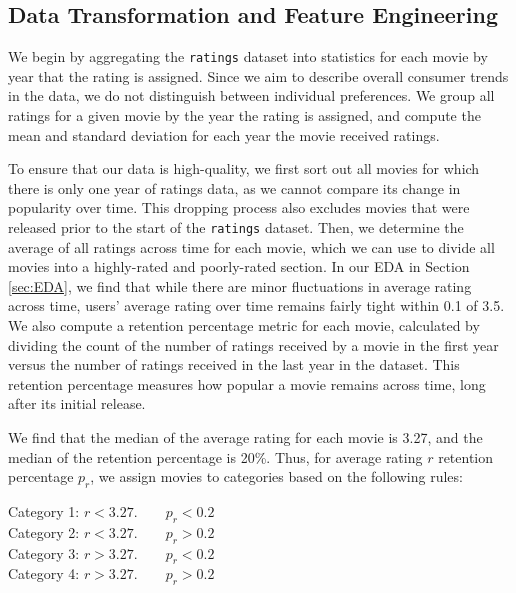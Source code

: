 \documentclass[12pt]{article}
\begin{document}


\subsection{Data Transformation and Feature Engineering}
\label{sec:data}
We begin by aggregating the \texttt{ratings} dataset into statistics for each movie by year that the rating is assigned. Since we aim to describe overall consumer trends in the data, we do not distinguish between individual preferences. We group all ratings for a given movie by the year the rating is assigned, and compute the mean and standard deviation for each year the movie received ratings. 

To ensure that our data is high-quality, we first sort out all movies for which there is only one year of ratings data, as we cannot compare its change in popularity over time. This dropping process also excludes movies that were released prior to the start of the \texttt{ratings} dataset. Then, we determine the average of all ratings across time for each movie, which we can use to divide all movies into a highly-rated and poorly-rated section. In our EDA in Section \ref{sec:EDA}, we find that while there are minor fluctuations in average rating across time, users' average rating over time remains fairly tight within 0.1 of 3.5. We also compute a retention percentage metric for each movie, calculated by dividing the count of the number of ratings received by a movie in the first year versus the number of ratings received in the last year in the dataset. This retention percentage measures how popular a movie remains across time, long after its initial release.

We find that the median of the average rating for each movie is 3.27, and the median of the retention percentage is 20\%. Thus, for average rating $r$ retention percentage $p_r$, we assign movies to categories based on the following rules:
\begin{center}
    Category 1: $r < 3.27. \qquad p_r < 0.2$\\
    Category 2: $r < 3.27. \qquad p_r > 0.2$\\
    Category 3: $r > 3.27. \qquad p_r < 0.2$\\
    Category 4: $r > 3.27. \qquad p_r > 0.2$\\
\end{center}
\end{document}
